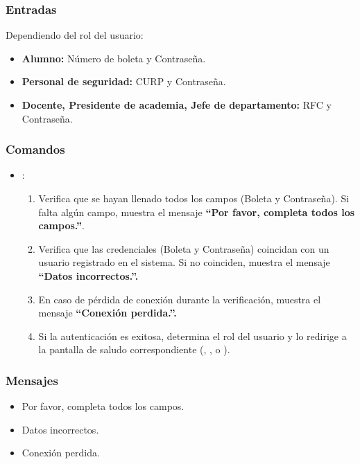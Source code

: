 \subsubsection{Entradas}
Dependiendo del rol del usuario:
\begin{itemize}
	\item \textbf{Alumno:} Número de boleta y Contraseña.
	\item \textbf{Personal de seguridad:} CURP y Contraseña.
	\item \textbf{Docente, Presidente de academia, Jefe de departamento:} RFC y Contraseña.
\end{itemize}
	
	\subsubsection{Comandos}
	\begin{itemize}
		\item {}:
		\begin{enumerate}
			\item Verifica que se hayan llenado todos los campos (Boleta y Contraseña). Si falta algún campo, muestra el mensaje \textbf{``Por favor, completa todos los campos.''}.
			\item Verifica que las credenciales (Boleta y Contraseña) coincidan con un usuario registrado en el sistema. Si no coinciden, muestra el mensaje \textbf{ ``Datos incorrectos.''.}
			\item En caso de pérdida de conexión durante la verificación, muestra el mensaje \textbf{ ``Conexión perdida.''.}
			\item Si la autenticación es exitosa, determina el rol del usuario y lo redirige a la pantalla de saludo correspondiente (, ,  o ).
		\end{enumerate}
		
	\end{itemize}
	
	\subsubsection{Mensajes}
	\begin{itemize}
		\item Por favor, completa todos los campos.
		\item Datos incorrectos.
		\item Conexión perdida.
	\end{itemize}


